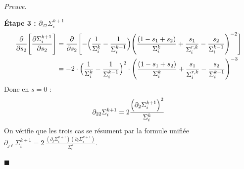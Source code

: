 \documentclass[12pt]{article}
\renewcommand{\qedsymbol}{$\blacksquare$}
\renewenvironment{proof}[1][\proofname]{%
  \par\medskip\noindent
  \textit{\color{proofgray}#1.}\enspace\ignorespaces
}{\hfill\qedsymbol\par\medskip}
\renewcommand{\proofname}{Preuve}
\begin{document}
\begin{proof}
\medskip
\textbf{Étape 3 : $\partial_{22}\Sigma_i^{k+1}$}
\begin{equation*}
    \begin{aligned}
\frac{\partial}{\partial s_2}\Biggl[ \frac{\partial \Sigma_i^{k+1}}{\partial s_2} \Biggr] &= \frac{\partial}{\partial s_2}\Biggl[  - \Bigl(\frac{1}{\Sigma_i^{k} } - \frac{1}{\Sigma_i^{k-1}}\Bigr) \Biggl( \frac{(1-s_1+s_2)}{\Sigma_i^{k}} + \frac{s_1}{\Sigma_i^{r,k}} - \frac{s_2}{\Sigma_i^{k-1}} \Biggr)^{-2}
\Biggr] \\
&= -2 \cdot \Bigl(\frac{1}{\Sigma_i^{k} } - \frac{1}{\Sigma_i^{k-1}}\Bigr)^2\cdot \Biggl( \frac{(1-s_1+s_2)}{\Sigma_i^{k}} + \frac{s_1}{\Sigma_i^{r,k}} - \frac{s_2}{\Sigma_i^{k-1}} \Biggr)^{-3}
    \end{aligned}
\end{equation*}
Donc en $s=0$ :
\begin{equation*}
\partial_{22} \Sigma_i^{k+1} = 2 \frac{\Bigl(\partial_2 \Sigma_i^{k+1}\Bigr)^2}{\Sigma_i^k}
\end{equation*}
On vérifie que les trois cas se résument par la formule unifiée $\partial_{j\ell}\Sigma_i^{k+1} = 2\,\frac{(\partial_j\Sigma_i^{k+1})(\partial_\ell\Sigma_i^{k+1})}{\Sigma_i^k}$.


\end{proof}
\end{document}
